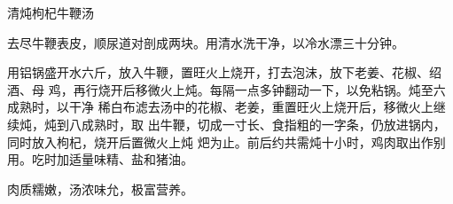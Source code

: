 \begin{recipe}{清炖枸杞牛鞭汤}

\ingredients



\preparation

去尽牛鞭表皮，顺尿道对剖成两块。用清水洗干净，以冷水漂三十分钟。

用铝锅盛开水六斤，放入牛鞭，置旺火上烧开，打去泡沫，放下老姜、花椒、绍酒、母
鸡，再行烧开后移微火上炖。每隔一点多钟翻动一下，以免粘锅。炖至六成熟时，以干净
稀白布滤去汤中的花椒、老姜，重置旺火上烧开后，移微火上继续炖，炖到八成熟时，取
出牛鞭，切成一寸长、食指粗的一字条，仍放进锅内，同时放入枸杞，烧开后置微火上炖
𤆵为止。前后约共需炖十小时，鸡肉取出作别用。吃时加适量味精、盐和猪油。

\features

肉质糯嫩，汤浓味允，极富营养。

\end{recipe}

